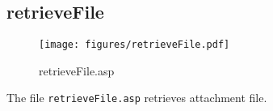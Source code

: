 \subsection{retrieveFile}
\begin{figure}[htb]
    \begin{center}
        \texttt{[image: figures/retrieveFile.pdf]}
    \end{center}
    \caption{retrieveFile.asp}
    \label{fig:retrieveFile}
\end{figure}

The file \verb|retrieveFile.asp| retrieves attachment file.
